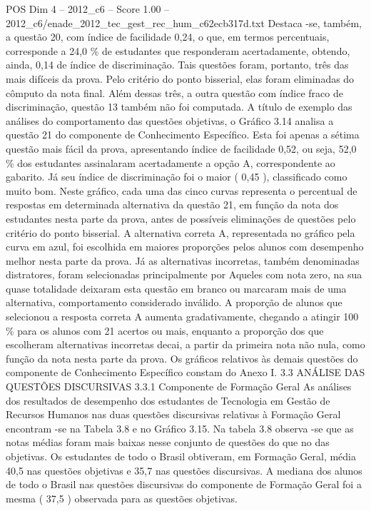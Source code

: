 \begin{textsample}{POS Dim 4 – 2012\_c6 – Score 1.00 – 2012\_c6/enade\_2012\_tec\_gest\_rec\_hum\_c62ecb317d.txt}
Destaca -se, também, a questão 20, com índice de facilidade 0,24, o que, em termos percentuais, corresponde a 24,0 \% de estudantes que responderam acertadamente, obtendo, ainda, 0,14 de índice de discriminação.
Tais questões foram, portanto, três das mais difíceis da prova.
Pelo critério do ponto bisserial, elas foram eliminadas do cômputo da nota final.
Além dessas três, a outra questão com índice fraco de discriminação, questão 13 também não foi computada.
A título de exemplo das análises do comportamento das questões objetivas, o Gráfico 3.14 analisa a questão 21 do componente de Conhecimento Específico.
Esta foi apenas a sétima questão mais fácil da prova, apresentando índice de facilidade 0,52, ou seja, 52,0 \% dos estudantes assinalaram acertadamente a opção A, correspondente ao gabarito.
Já seu índice de discriminação foi o maior ( 0,45 ), classificado como muito bom.
Neste gráfico, cada uma das cinco curvas representa o percentual de respostas em determinada alternativa da questão 21, em função da nota dos estudantes nesta parte da prova, antes de possíveis eliminações de questões pelo critério do ponto bisserial.
A alternativa correta A, representada no gráfico pela curva em azul, foi escolhida em maiores proporções pelos alunos com desempenho melhor nesta parte da prova.
Já as alternativas incorretas, também denominadas distratores, foram selecionadas principalmente por Aqueles com nota zero, na sua quase totalidade deixaram esta questão em branco ou marcaram mais de uma alternativa, comportamento considerado inválido.
A proporção de alunos que selecionou a resposta correta A aumenta gradativamente, chegando a atingir 100 \% para os alunos com 21 acertos ou mais, enquanto a proporção dos que escolheram alternativas incorretas decai, a partir da primeira nota não nula, como função da nota nesta parte da prova.
Os gráficos relativos às demais questões do componente de Conhecimento Específico constam do Anexo I. 3.3 ANÁLISE DAS QUESTÕES DISCURSIVAS 3.3.1 Componente de Formação Geral As análises dos resultados de desempenho dos estudantes de Tecnologia em Gestão de Recursos Humanos nas duas questões discursivas relativas à Formação Geral encontram -se na Tabela 3.8 e no Gráfico 3.15.
Na tabela 3.8 observa -se que as notas médias foram mais baixas nesse conjunto de questões do que no das objetivas.
Os estudantes de todo o Brasil obtiveram, em Formação Geral, média 40,5 nas questões objetivas e 35,7 nas questões discursivas.
A mediana dos alunos de todo o Brasil nas questões discursivas do componente de Formação Geral foi a mesma ( 37,5 ) observada para as questões objetivas.

\end{textsample}
